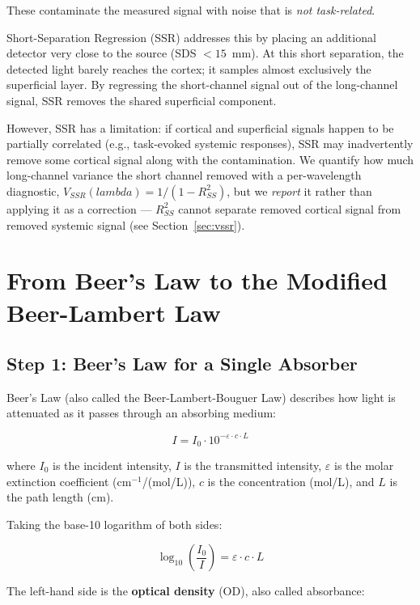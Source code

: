 \documentclass[12pt]{article}
\def\lambda{lambda}%
\def\text#1{#1}%
\begin{document}
These contaminate the measured signal with noise that is \emph{not task-related}.

Short-Separation Regression (SSR) addresses this by placing an additional detector very close to the source (SDS $< 15$~mm). At this short separation, the detected light barely reaches the cortex; it samples almost exclusively the superficial layer. By regressing the short-channel signal out of the long-channel signal, SSR removes the shared superficial component.

However, SSR has a limitation: if cortical and superficial signals happen to be partially correlated (e.g., task-evoked systemic responses), SSR may inadvertently remove some cortical signal along with the contamination. We quantify how much long-channel variance the short channel removed with a per-wavelength diagnostic, $V_{\text{SSR}}(\lambda) = 1/(1-R^2_{\text{SS}})$, but we \emph{report} it rather than applying it as a correction --- $R^2_{\text{SS}}$ cannot separate removed cortical signal from removed systemic signal (see Section~\ref{sec:vssr}).

\section{From Beer's Law to the Modified Beer-Lambert Law}

\subsection{Step 1: Beer's Law for a Single Absorber}

Beer's Law (also called the Beer-Lambert-Bouguer Law) describes how light is attenuated as it passes through an absorbing medium:

\begin{equation}
I = I_0 \cdot 10^{-\varepsilon \cdot c \cdot L}
\end{equation}

where $I_0$ is the incident intensity, $I$ is the transmitted intensity, $\varepsilon$ is the molar extinction coefficient (cm$^{-1}$/(mol/L)), $c$ is the concentration (mol/L), and $L$ is the path length (cm).

Taking the base-10 logarithm of both sides:

\begin{equation}
\log_{10}\left(\frac{I_0}{I}\right) = \varepsilon \cdot c \cdot L
\end{equation}

The left-hand side is the \textbf{optical density} (OD), also called absorbance:
\end{document}
